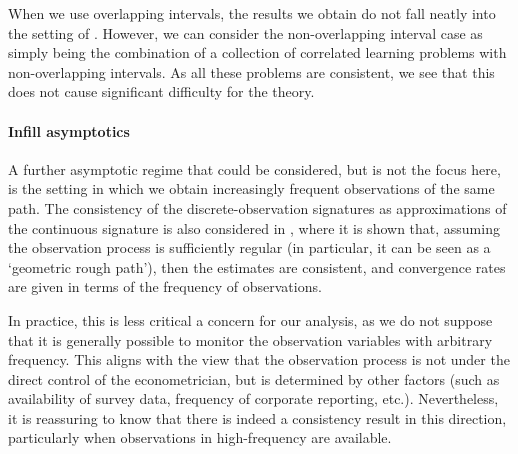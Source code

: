 \documentclass[a4paper, 12pt]{article}
\theoremstyle{remark}
\begin{document}
When we use overlapping intervals, the results we obtain do not fall neatly into the setting of \cite{lucchese2025learning}. However, we can consider the non-overlapping interval case as simply being the combination of a collection of correlated learning problems with non-overlapping intervals. As all these problems are consistent, we see that this does not cause significant difficulty for the theory.

\paragraph{Infill asymptotics}

A further asymptotic regime that could be considered, but is not the focus here, is the setting in which we obtain increasingly frequent observations of the same path. The consistency of the discrete-observation signatures as approximations of the continuous signature is also considered in \cite{lucchese2025learning}, where it is shown that, assuming the observation process is sufficiently regular (in particular, it can be seen as a `geometric rough path'), then the estimates are consistent, and convergence rates are given in terms of the frequency of observations.

In practice, this is less critical a concern for our analysis, as we do not suppose that it is generally possible to monitor the observation variables with arbitrary frequency. This aligns with the view that the observation process is not under the direct control of the econometrician, but is determined by other factors (such as availability of survey data, frequency of corporate reporting, etc.). Nevertheless, it is reassuring to know that there is indeed a consistency result in this direction, particularly when observations in high-frequency are available.
\end{document}

